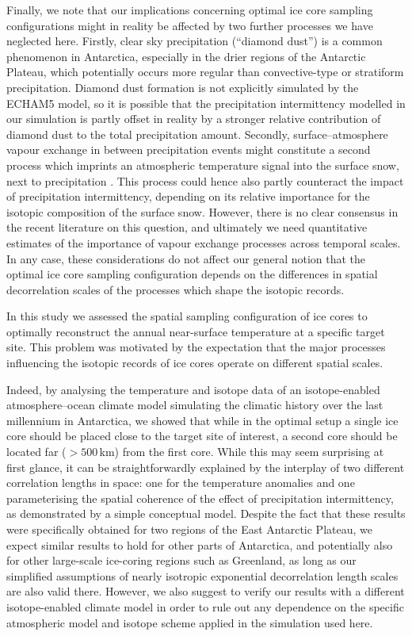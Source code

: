 \documentclass[cp, manuscript]{copernicus}
\begin{document}
Finally, we note that our implications concerning optimal ice core sampling
configurations might in reality be affected by two further processes we have
neglected here. Firstly, clear sky precipitation (``diamond dust'') is a common
phenomenon in Antarctica, especially in the drier regions of the Antarctic
Plateau, which potentially occurs more regular than convective-type or
stratiform precipitation. Diamond dust formation is not explicitly simulated by
the ECHAM5 model, so it is possible that the precipitation intermittency
modelled in our simulation is partly offset in reality by a stronger relative
contribution of diamond dust to the total precipitation amount. Secondly,
surface--atmosphere vapour exchange in between precipitation events might
constitute a second process which imprints an atmospheric temperature signal
into the surface snow, next to
precipitation \citep[e.g.,][]{Steen-Larsen2014,Madsen2019}. This process could
hence also partly counteract the impact of precipitation intermittency,
depending on its relative importance for the isotopic composition of the surface
snow. However, there is no clear consensus in the recent literature on this
question, and ultimately we need quantitative estimates of the importance of
vapour exchange processes across temporal scales. In any case, these
considerations do not affect our general notion that the optimal ice core
sampling configuration depends on the differences in spatial decorrelation
scales of the processes which shape the isotopic records.

\conclusions

In this study we assessed the spatial sampling configuration of ice cores to
optimally reconstruct the annual near-surface temperature at a specific target
site. This problem was motivated by the expectation that the major processes
influencing the isotopic records of ice cores operate on different spatial
scales.

Indeed, by analysing the temperature and isotope data of an isotope-enabled
atmosphere--ocean climate model simulating the climatic history over the last
millennium in Antarctica, we showed that while in the optimal setup a single ice
core should be placed close to the target site of interest, a second core should
be located far ($>500$\,km) from the first core. While this may seem surprising
at first glance, it can be straightforwardly explained by the interplay of two
different correlation lengths in space: one for the temperature anomalies and
one parameterising the spatial coherence of the effect of precipitation
intermittency, as demonstrated by a simple conceptual model. Despite the fact
that these results were specifically obtained for two regions of the East
Antarctic Plateau, we expect similar results to hold for other parts of
Antarctica, and potentially also for other large-scale ice-coring regions such
as Greenland, as long as our simplified assumptions of nearly isotropic
exponential decorrelation length scales are also valid there. However, we also
suggest to verify our results with a different isotope-enabled climate model in
order to rule out any dependence on the specific atmospheric model and isotope
scheme applied in the simulation used here.
\end{document}
